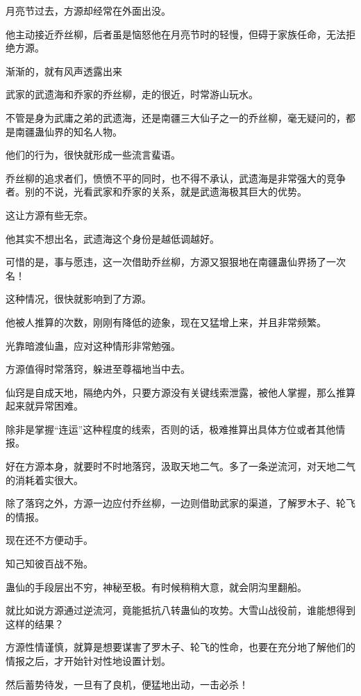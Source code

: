 
\begin{this_body}

月亮节过去，方源却经常在外面出没。

他主动接近乔丝柳，后者虽是恼怒他在月亮节时的轻慢，但碍于家族任命，无法拒绝方源。

渐渐的，就有风声透露出来

武家的武遗海和乔家的乔丝柳，走的很近，时常游山玩水。

不管是身为武庸之弟的武遗海，还是南疆三大仙子之一的乔丝柳，毫无疑问的，都是南疆蛊仙界的知名人物。

他们的行为，很快就形成一些流言蜚语。

乔丝柳的追求者们，愤愤不平的同时，也不得不承认，武遗海是非常强大的竞争者。别的不说，光看武家和乔家的关系，就是武遗海极其巨大的优势。

这让方源有些无奈。

他其实不想出名，武遗海这个身份是越低调越好。

可惜的是，事与愿违，这一次借助乔丝柳，方源又狠狠地在南疆蛊仙界扬了一次名！

这种情况，很快就影响到了方源。

他被人推算的次数，刚刚有降低的迹象，现在又猛增上来，并且非常频繁。

光靠暗渡仙蛊，应对这种情形非常勉强。

方源值得时常落窍，躲进至尊福地当中去。

仙窍是自成天地，隔绝内外，只要方源没有关键线索泄露，被他人掌握，那么推算起来就异常困难。

除非是掌握“连运”这种程度的线索，否则的话，极难推算出具体方位或者其他情报。

好在方源本身，就要时不时地落窍，汲取天地二气。多了一条逆流河，对天地二气的消耗着实很大。

除了落窍之外，方源一边应付乔丝柳，一边则借助武家的渠道，了解罗木子、轮飞的情报。

现在还不方便动手。

知己知彼百战不殆。

蛊仙的手段层出不穷，神秘至极。有时候稍稍大意，就会阴沟里翻船。

就比如说方源通过逆流河，竟能抵抗八转蛊仙的攻势。大雪山战役前，谁能想得到这样的结果？

方源性情谨慎，就算是想要谋害了罗木子、轮飞的性命，也要在充分地了解他们的情报之后，才开始针对性地设置计划。

然后蓄势待发，一旦有了良机，便猛地出动，一击必杀！


\end{this_body}
